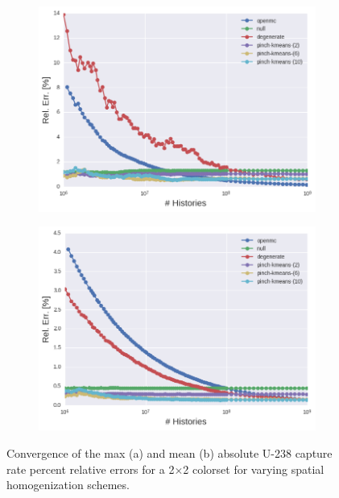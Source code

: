 \clearpage

\begin{figure}[h!]
\centering
\begin{subfigure}{\textwidth}
  \centering
  \includegraphics[width=0.9\linewidth]{figures/results/2x2/ensemble-transform/evo-capture-max}
  \caption{}
  \label{fig:chap11-2x2-capture-converge-max}
\end{subfigure}
\begin{subfigure}{\textwidth}
  \centering
  \includegraphics[width=0.9\linewidth]{figures/results/2x2/ensemble-transform/evo-capture-mean}
  \caption{}
  \label{fig:chap11-2x2-capture-converge-mean}
\end{subfigure}
\vspace{2mm}
\caption[Fission rate covergence for a 2$\times$2 colorset]{Convergence of the max (a) and mean (b) absolute U-238 capture rate percent relative errors for a 2$\times$2 colorset for varying spatial homogenization schemes.}
\label{fig:chap11-2x2-capture-converge}
\end{figure}

